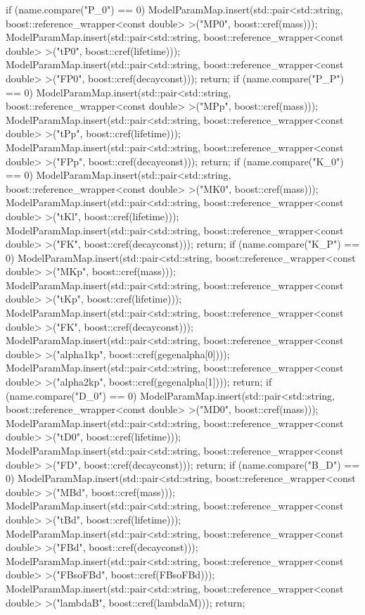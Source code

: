 \documentclass[preprint,3p,12pt]{elsarticle}
\begin{document}
    if (name.compare("P_0") == 0) {
        ModelParamMap.insert(std::pair<std::string, boost::reference_wrapper<const double> >("MP0", boost::cref(mass)));
        ModelParamMap.insert(std::pair<std::string, boost::reference_wrapper<const double> >("tP0", boost::cref(lifetime)));
        ModelParamMap.insert(std::pair<std::string, boost::reference_wrapper<const double> >("FP0", boost::cref(decayconst)));
        return;
    }
    if (name.compare("P_P") == 0) {
        ModelParamMap.insert(std::pair<std::string, boost::reference_wrapper<const double> >("MPp", boost::cref(mass)));
        ModelParamMap.insert(std::pair<std::string, boost::reference_wrapper<const double> >("tPp", boost::cref(lifetime)));
        ModelParamMap.insert(std::pair<std::string, boost::reference_wrapper<const double> >("FPp", boost::cref(decayconst)));
        return;
    }
    if (name.compare("K_0") == 0) {
        ModelParamMap.insert(std::pair<std::string, boost::reference_wrapper<const double> >("MK0", boost::cref(mass)));
        ModelParamMap.insert(std::pair<std::string, boost::reference_wrapper<const double> >("tKl", boost::cref(lifetime)));
        ModelParamMap.insert(std::pair<std::string, boost::reference_wrapper<const double> >("FK", boost::cref(decayconst)));
        return;
    }
    if (name.compare("K_P") == 0) {
        ModelParamMap.insert(std::pair<std::string, boost::reference_wrapper<const double> >("MKp", boost::cref(mass)));
        ModelParamMap.insert(std::pair<std::string, boost::reference_wrapper<const double> >("tKp", boost::cref(lifetime)));
        ModelParamMap.insert(std::pair<std::string, boost::reference_wrapper<const double> >("FK", boost::cref(decayconst)));
        ModelParamMap.insert(std::pair<std::string, boost::reference_wrapper<const double> >("alpha1kp", boost::cref(gegenalpha[0])));
        ModelParamMap.insert(std::pair<std::string, boost::reference_wrapper<const double> >("alpha2kp", boost::cref(gegenalpha[1])));
        return;
    }
    if (name.compare("D_0") == 0) {
        ModelParamMap.insert(std::pair<std::string, boost::reference_wrapper<const double> >("MD0", boost::cref(mass)));
        ModelParamMap.insert(std::pair<std::string, boost::reference_wrapper<const double> >("tD0", boost::cref(lifetime)));
        ModelParamMap.insert(std::pair<std::string, boost::reference_wrapper<const double> >("FD", boost::cref(decayconst)));
        return;
    }
    if (name.compare("B_D") == 0) {
        ModelParamMap.insert(std::pair<std::string, boost::reference_wrapper<const double> >("MBd", boost::cref(mass)));
        ModelParamMap.insert(std::pair<std::string, boost::reference_wrapper<const double> >("tBd", boost::cref(lifetime)));
        ModelParamMap.insert(std::pair<std::string, boost::reference_wrapper<const double> >("FBd", boost::cref(decayconst)));
        ModelParamMap.insert(std::pair<std::string, boost::reference_wrapper<const double> >("FBsoFBd", boost::cref(FBsoFBd)));
        ModelParamMap.insert(std::pair<std::string, boost::reference_wrapper<const double> >("lambdaB", boost::cref(lambdaM)));
        return;
    }
\end{document}
